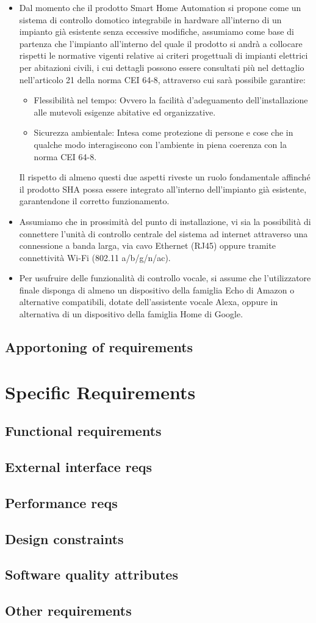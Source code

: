\documentclass[12pt,a4paper]{report}
\begin{document}
\begin{itemize}
	\item Dal momento che il prodotto Smart Home Automation si propone come un sistema di controllo domotico integrabile in hardware all’interno di un impianto già esistente senza eccessive modifiche, assumiamo come base di partenza che l’impianto all’interno del quale il prodotto si andrà a collocare rispetti le normative vigenti relative ai criteri progettuali di impianti elettrici per abitazioni civili, i cui dettagli possono essere consultati più nel dettaglio nell’articolo 21 della norma CEI 64-8, attraverso cui sarà possibile garantire:
	\begin{itemize}
		\item Flessibilità nel tempo: Ovvero la facilità d’adeguamento dell’installazione alle mutevoli esigenze abitative ed organizzative.
		\item Sicurezza ambientale: Intesa come protezione di persone e cose che in qualche modo interagiscono con l’ambiente in piena coerenza con la norma CEI 64-8.

	\end{itemize}
	Il rispetto di almeno questi due aspetti riveste un ruolo fondamentale affinché il prodotto SHA possa essere integrato all’interno dell’impianto già esistente, garantendone il corretto funzionamento.
	\item Assumiamo che in prossimità del punto di installazione, vi sia la possibilità di connettere l’unità di controllo centrale del sistema ad internet attraverso una connessione a banda larga, via cavo Ethernet (RJ45) oppure tramite connettività Wi-Fi (802.11 a/b/g/n/ac).
	\item  Per usufruire delle funzionalità di controllo vocale, si assume che l’utilizzatore finale disponga di almeno un dispositivo della famiglia Echo di Amazon o alternative compatibili, dotate dell’assistente vocale Alexa, oppure in alternativa di un dispositivo della famiglia Home di Google.

\end{itemize}

\section{Apportoning of requirements}
\chapter{Specific Requirements}
\section{Functional requirements}
\section{External interface reqs}
\section{Performance reqs}
\section{Design constraints}
\section{Software quality attributes}
\section{Other requirements}
\end{document}
